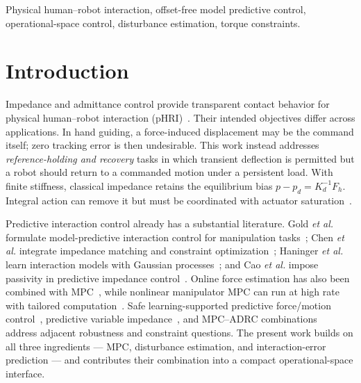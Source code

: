 \documentclass[journal]{IEEEtran}
\begin{document}
\begin{IEEEkeywords}
Physical human--robot interaction, offset-free model predictive control,
operational-space control, disturbance estimation, torque constraints.
\end{IEEEkeywords}

\section{Introduction}

Impedance and admittance control provide transparent contact behavior for
physical human--robot interaction (pHRI)~\cite{hogan1985impedance,chiaverini1999survey}.
Their intended objectives differ across applications.  In hand guiding, a
force-induced displacement may be the command itself; zero tracking error is
then undesirable.  This work instead addresses \emph{reference-holding and
recovery} tasks in which transient deflection is permitted but a robot should
return to a commanded motion under a persistent load.  With finite stiffness,
classical impedance retains the equilibrium bias
$p-p_d=K_d^{-1}F_h$.  Integral action can remove it but must be coordinated
with actuator saturation~\cite{cao2004antiwindup,cao2002antiwindup}.

Predictive interaction control already has a substantial literature. Gold
\emph{et al.} formulate model-predictive interaction control for manipulation
tasks~\cite{gold2023mpic}; Chen \emph{et al.} integrate impedance matching and
constraint optimization~\cite{chen2025unified}; Haninger \emph{et al.} learn
interaction models with Gaussian processes~\cite{haninger2023model}; and
Cao \emph{et al.} impose passivity in predictive impedance
control~\cite{cao2023passive}.  Online force estimation has also been combined
with MPC~\cite{jordana2024force}, while nonlinear manipulator MPC can run at
high rate with tailored computation~\cite{kleff2021highfrequency}.  Safe
learning-supported predictive force/motion control~\cite{matschek2023safe},
predictive variable impedance~\cite{liu2025model}, and MPC--ADRC
combinations~\cite{wu2025ensuring} address adjacent robustness and constraint
questions.  The present work builds on all three ingredients --- MPC,
disturbance estimation, and interaction-error prediction --- and contributes
their combination into a compact operational-space interface.
\end{document}
